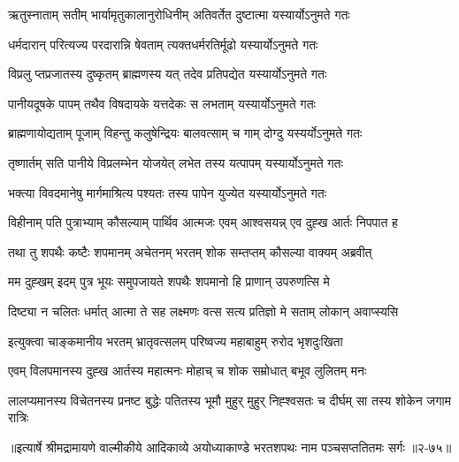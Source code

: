 \twolineshloka
{ऋतुस्नाताम् सतीम् भार्यामृतुकालानुरोधिनीम्}
{अतिवर्तेत दुष्टात्मा यस्यार्योऽनुमते गतः} %

\twolineshloka
{धर्मदारान् परित्यज्य परदारान्नि षेवताम्}
{त्यक्तधर्मरतिर्मूढो यस्यार्योऽनुमते गतः} %

\twolineshloka
{विप्रलु प्तप्रजातस्य दुष्कृतम् ब्राह्मणस्य यत्}
{तदेव प्रतिपद्येत यस्यार्योऽनुमते गतः} %

\twolineshloka
{पानीयदूषके पापम् तथैव विषदायके}
{यत्तदेकः स लभताम् यस्यार्योऽनुमते गतः} %

\twolineshloka
{ब्राह्मणायोद्यताम् पूजाम् विहन्तु कलुषेन्द्रियः}
{बालवत्साम् च गाम् दोग्दु यस्यर्योऽनुमते गतः} %

\twolineshloka
{तृष्णार्तम् सति पानीये विप्रलम्भेन योजयेत्}
{लभेत तस्य यत्पापम् यस्यार्योऽनुमते गतः} %

\twolineshloka
{भक्त्या विवदमानेषु मार्गमाश्रित्य पश्यतः}
{तस्य पापेन युज्येत यस्यार्योऽनुमते गतः} %

\twolineshloka
{विहीनाम् पति पुत्राभ्याम् कौसल्याम् पार्थिव आत्मजः}
{एवम् आश्वसयन्न् एव दुह्ख आर्तः निपपात ह} %

\twolineshloka
{तथा तु शपथैः कष्टैः शपमानम् अचेतनम्}
{भरतम् शोक सम्तप्तम् कौसल्या वाक्यम् अब्रवीत्} %

\twolineshloka
{मम दुह्खम् इदम् पुत्र भूयः समुपजायते}
{शपथैः शपमानो हि प्राणान् उपरुणत्सि मे} %

\twolineshloka
{दिष्ट्या न चलितः धर्मात् आत्मा ते सह लक्ष्मणः}
{वत्स सत्य प्रतिज्ञो मे सताम् लोकान् अवाप्स्यसि} %

\twolineshloka
{इत्युक्त्वा चाङ्कमानीय भरतम् भ्रातृवत्सलम्}
{परिष्वज्य महाबाहुम् रुरोद भृशदुःखिता} %

\twolineshloka
{एवम् विलपमानस्य दुह्ख आर्तस्य महात्मनः}
{मोहाच् च शोक सम्रोधात् बभूव लुलितम् मनः} %

\fourlineindentedshloka
{लालप्यमानस्य विचेतनस्य}
{प्रनष्ट बुद्धेः पतितस्य भूमौ}
{मुहुर् मुहुर् निह्श्वसतः च दीर्घम्}
{सा तस्य शोकेन जगाम रात्रिः} %


॥इत्यार्षे श्रीमद्रामायणे वाल्मीकीये आदिकाव्ये अयोध्याकाण्डे भरतशपथः नाम पञ्चसप्ततितमः सर्गः ॥२-७५॥
